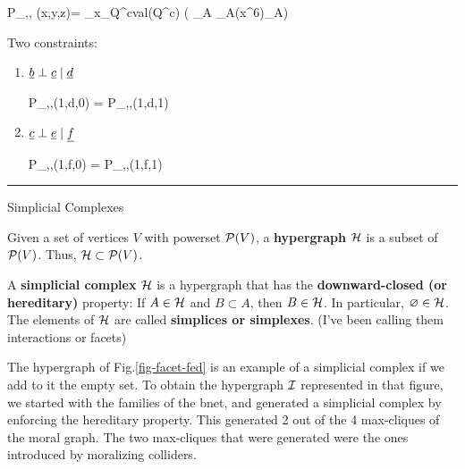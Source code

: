 \beq
P_{\rvx,\rvy, \rvz}(x,y,z)=
\sum_{x_{Q^c}\in val(Q^c)}
\exp\left(  \sum_{A\in \cali}
\cals_A(x^6)\theta_A\right)
\eeq


Two constraints:

\begin{enumerate}

\item $\rvb\perp\rvc\mid\rvd$

\beq
{}
{P_{\rvb,\rvd,\rvc}(1,d,0)}
=
{P_{\rvb,\rvd,\rvc}(1,d,1)}
\eeq

\item $\rvc\perp\rve \mid \rvf$


\beq
{}
{P_{\rvc,\rvf,\rve}(1,f,0)}
=
{P_{\rvc,\rvf,\rve}(1,f,1)}
\eeq
\end{enumerate}
\hrule
Simplicial Complexes

Given a set of vertices $V$ with powerset ${\cal P}(V)$,
a {\bf hypergraph}
${\cal H}$ is a subset
of ${\cal P}(V)$. Thus, ${\cal H}\subset {\cal P}(V)$.

A {\bf simplicial complex} ${\cal H}$
is a hypergraph
that has the {\bf downward-closed (or hereditary)} property:
If $A\in {\cal H}$ and $B\subset A$, then $B\in {\cal H}$.
In particular, $\varnothing \in {\cal H}$.
The elements of ${\cal H}$ are called {\bf
simplices or simplexes}.
(I've been calling them interactions or facets)


The hypergraph of Fig.\ref{fig-facet-fed} is an example of a simplicial complex if we add to it the empty set.
To obtain the hypergraph ${\cal I}$ represented in that figure,
we started with the families of the bnet, and generated a simplicial complex by
enforcing the hereditary property.
This generated 2 out of the 4 max-cliques
of the moral graph. The two max-cliques
that were generated were the ones
introduced by moralizing colliders.

